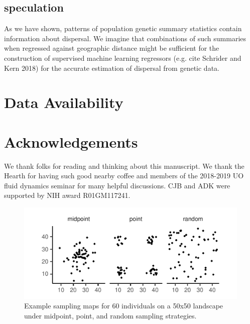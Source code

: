 \documentclass[10pt,twoside,lineno]{gsajnl}
\newif\ifcomments
\newcommand{\ak}[1]{\ifcomments{{\color{red} \it (#1)}}\else{}\fi}
\begin{document}
\subsection{speculation}
As we have shown, patterns of population genetic summary statistics contain information about dispersal. We imagine that combinations of such summaries when regressed against geographic distance might be sufficient for the construction of supervised machine learning regressors (e.g. cite Schrider and Kern 2018) for the accurate estimation of dispersal from genetic data. 

\ak{other things to say?}

\section{Data Availability}
\ak{github repo}

\section{Acknowledgements}
We thank folks for reading and thinking about this manuscript. We thank the Hearth for having such good nearby coffee and members of the 2018-2019 UO fluid dynamics seminar for many helpful discussions. CJB and ADK were supported by NIH award R01GM117241. 


\begin{figure}[htbp]
\includegraphics{figures/sampling_maps.pdf}
\caption{Example sampling maps for 60 individuals on a 50x50 landscape under midpoint, point, and random sampling strategies.}
\label{fig:samplemap}
\end{figure}
\end{document}

